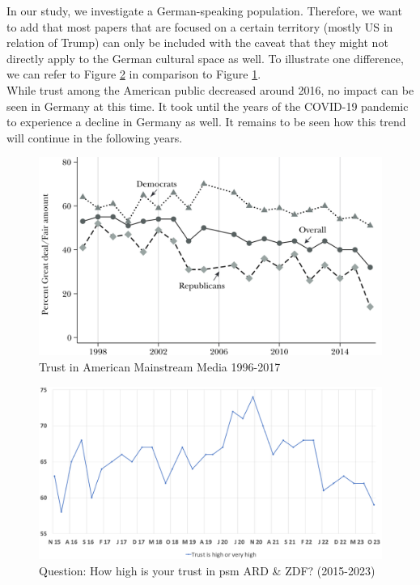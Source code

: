 \documentclass[
  a4paper,  %
  twoside,  %
  bibliography=totoc,
  headsepline,
  cleardoublepage=empty,
  parskip=half,
  draft=false
]{scrbook}
\begin{document}
In our study, we investigate a German-speaking population. Therefore, we want to add that most papers that are focused on a certain territory (mostly US in relation of Trump) can only be included with the caveat that they might not directly apply to the German cultural space as well. To illustrate one difference, we can refer to Figure \ref{fig:trust-ger} in comparison to Figure \ref{fig:trust-us}. \\
While trust among the American public decreased around 2016, no impact can be seen in Germany at this time. It took until the years of the COVID-19 pandemic to experience a decline in Germany as well. It remains to be seen how this trend will continue in the following years.

\begin{figure}[h]
  \centering
  \centering
  \includegraphics[width=0.75\linewidth]{./graphics/trust-america mainstream.png}
  \caption{Trust in American Mainstream Media 1996-2017 \cite{allcottSocialMediaFake2017}}
  \label{fig:trust-us}
\end{figure}
\begin{figure}[h]
  \centering
  \includegraphics[width=0.8\linewidth]{./graphics/FGW-Trust-in-ARDZDF.png}
  \caption{Question: How high is your trust in \gls{psm} ARD \& ZDF? (2015-2023) \cite{zdf-politbarometerVertrauenGlaubwuerdigkeitBerichterstattung2023}}
  \label{fig:trust-ger}
\end{figure}
\end{document}
